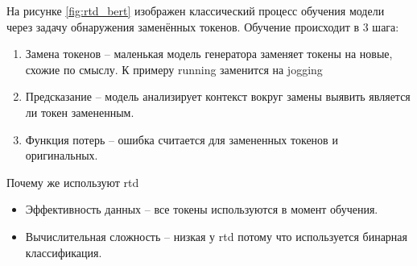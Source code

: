 \documentclass[../part_1.tex]{subfiles}
\begin{document}
\par На рисунке \ref{fig:rtd_bert} изображен классический процесс обучения модели через задачу обнаружения заменённых токенов. Обучение происходит в 3 шага:
\begin{enumerate}
    \item Замена токенов -- маленькая модель генератора заменяет токены на новые, схожие по смыслу. К примеру running заменится на jogging 
    \item Предсказание -- модель анализирует контекст вокруг замены выявить является ли токен замененным.
    \item Функция потерь -- ошибка считается для замененных токенов и оригинальных.
\end{enumerate}
\par Почему же используют \acrshort{rtd}
\begin{itemize}
    \item Эффективность данных -- все токены используются в момент обучения.
    \item Вычислительная сложность -- низкая у \acrshort{rtd} потому что используется бинарная классификация.
\end{itemize}
\end{document}
